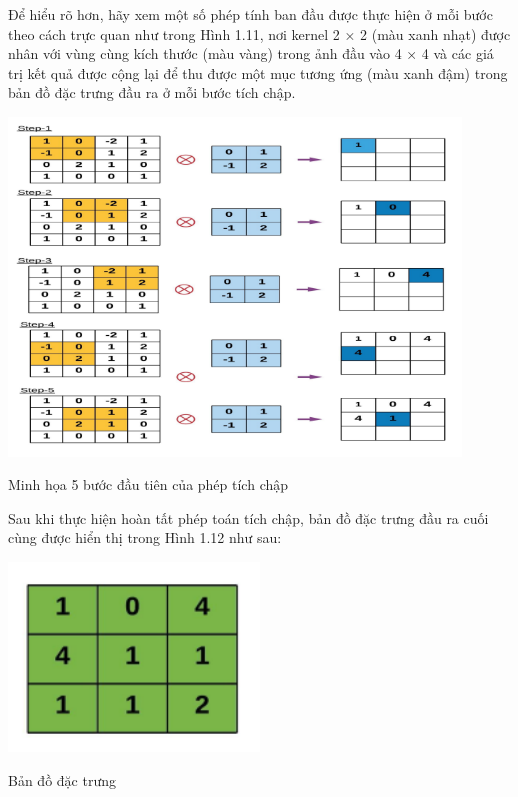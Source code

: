 \begin{enumerate}
    Để hiểu rõ hơn, hãy xem một số phép tính ban đầu được thực hiện ở mỗi bước theo cách trực quan như trong Hình 1.11, nơi kernel 2 × 2 (màu xanh nhạt) được nhân với vùng cùng kích thước (màu vàng) trong ảnh đầu vào 4 × 4 và các giá trị kết quả được cộng lại để thu được một mục tương ứng (màu xanh đậm) trong bản đồ đặc trưng đầu ra ở mỗi bước tích chập.

    \begin{minipage}{\linewidth}
            \captionsetup{type=figure}
            \centering
            \includegraphics[width=0.9\textwidth]{images/conv.png}
            \caption{ Minh họa 5 bước đầu tiên của phép tích chập }
    \end{minipage}

    Sau khi thực hiện hoàn tất phép toán tích chập, bản đồ đặc trưng đầu ra cuối cùng được hiển thị trong Hình 1.12 như sau:
    
    \begin{minipage}{\linewidth}
            \captionsetup{type=figure}
            \centering
            \includegraphics[width=0.5\textwidth]{images/feature_map.png}
            \caption{Bản đồ đặc trưng}
    \end{minipage}


\end{enumerate}
